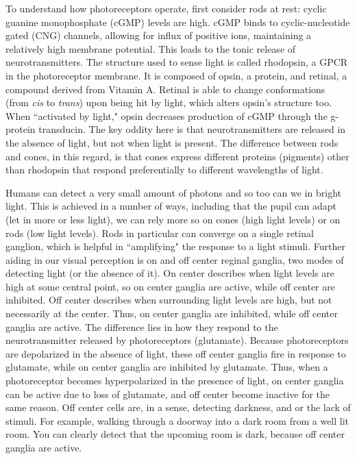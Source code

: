 \documentclass[12pt]{report}
\begin{document}
To understand how photoreceptors operate, first consider rods at rest: cyclic guanine monophosphate (cGMP) levels are high. cGMP binds to cyclic-nucleotide gated (CNG) channels, allowing for influx of positive ions, maintaining a relatively high membrane potential. This leads to the tonic release of neurotransmitters. The structure used to sense light is called rhodopsin, a GPCR in the photoreceptor membrane. It is composed of opsin, a protein, and retinal, a compound derived from Vitamin A. Retinal is able to change conformations (from \textit{cis} to \textit{trans}) upon being hit by light, which alters opsin's structure too. When ``activated by light," opsin decreases production of cGMP through the g-protein transducin. The key oddity here is that neurotransmitters are released in the absence of light, but not when light is present. The difference between rods and cones, in this regard, is that cones express different proteins (pigments) other than rhodopsin that respond preferentially to different wavelengths of light.\newline

Humans can detect a very small amount of photons and so too can we in bright light. This is achieved in a number of ways, including that the pupil can adapt (let in more or less light), we can rely more so on cones (high light levels) or on rods (low light levels). Rods in particular can converge on a single retinal ganglion, which is helpful in ``amplifying" the response to a light stimuli. Further aiding in our visual perception is on and off center reginal ganglia,  two modes of detecting light (or the absence of it). On center describes when light levels are high at some central point, so on center ganglia are active, while off center are inhibited. Off center describes when surrounding light levels are high, but not necessarily at the center. Thus, on center ganglia are inhibited, while off center ganglia are active. The difference lies in how they respond to the neurotransmitter released by photoreceptors (glutamate). Because photoreceptors are depolarized in the absence of light, these off center ganglia fire in response to glutamate, while on center ganglia are inhibited by glutamate. Thus, when a photoreceptor becomes hyperpolarized in the presence of light, on center ganglia can be active due to loss of glutamate, and off center become inactive for the same reason. Off center cells are, in a sense, detecting darkness, and or the lack of stimuli. For example, walking through a doorway into a dark room from a well lit room. You can clearly detect that the upcoming room is dark, because off center ganglia are active.
\end{document}
